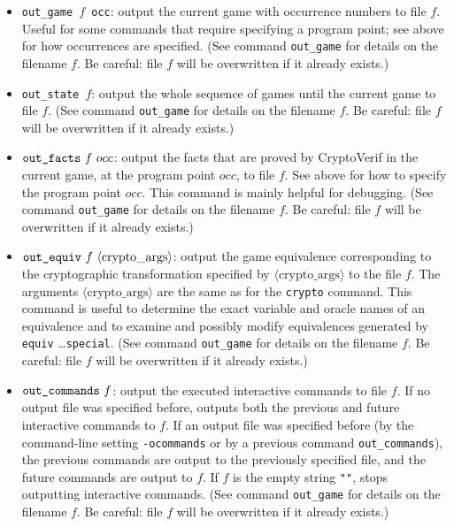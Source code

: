 \documentclass{article}
\newcommand{\nonterm}[1]{\langle\textrm{#1}\rangle}
\begin{document}
\begin{itemize}
\item \texttt{out\string_game $f$ occ}: output the current game with
  occurrence numbers to file $f$. Useful for some commands that require specifying a
  program point; see above for how occurrences are specified.
  (See command \texttt{out\string_game} for details on the filename $f$.
  Be careful: file $f$ will be overwritten if it already exists.)

\item \texttt{out\string_state $f$}: output the whole sequence
of games until the current game to file $f$.
(See command \texttt{out\string_game} for details on the filename $f$.
Be careful: file $f$ will be overwritten if it already exists.)

\item $\texttt{out\string_facts}\ f\ occ$: output the facts that are proved
  by CryptoVerif in the current game, at the program point $occ$,
  to file $f$. 
See above for how to specify the program point $occ$.
This command is mainly helpful for debugging.
(See command \texttt{out\string_game} for details on the filename $f$.
Be careful: file $f$ will be overwritten if it already exists.)

\item $\texttt{out\string_equiv}\ f\ \nonterm{crypto\_args}$: output the
game equivalence corresponding to the cryptographic transformation
specified by $\nonterm{crypto\_args}$ to the file $f$. 
The arguments $\nonterm{crypto\_args}$ are the same as
for the \texttt{crypto} command.
This command is useful to determine the exact variable and oracle
names of an equivalence and to examine and possibly modify equivalences
generated by \texttt{equiv} \dots \texttt{special}.
(See command \texttt{out\string_game} for details on the filename $f$.
Be careful: file $f$ will be overwritten if it already exists.)

\item $\texttt{out\string_commands}\ f$: output the executed interactive commands
  to file $f$. If no output file was specified before, outputs both the previous
  and future interactive commands to $f$. If an output file was specified before
  (by the command-line setting \texttt{-ocommands} or by a previous command
  \texttt{out\string_commands}), the previous commands are output to the previously
  specified file, and the future commands are output to $f$.
  If $f$ is the empty string \texttt{""}, stops outputting interactive commands.
(See command \texttt{out\string_game} for details on the filename $f$.
Be careful: file $f$ will be overwritten if it already exists.)


\end{itemize}
\end{document}
